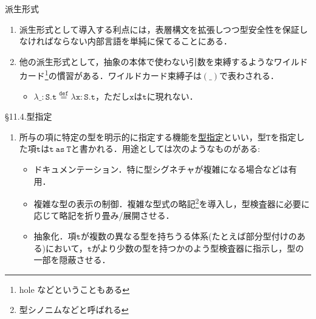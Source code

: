 \documentclass[9pt]{beamer}
\begin{document}
\begin{frame}{派生形式}
\begin{enumerate}\item 派生形式として導入する利点には，表層構文を拡張しつつ型安全性を保証しなければならない内部言語を単純に保てることにある．
    \item 他の派生形式として，抽象の本体で使わない引数を束縛するようなワイルドカード\footnote{hole などということもある}の慣習がある．ワイルドカード束縛子は$(\_)$で表わされる．
    \begin{itemize}
    \item $\mathtt{\lambda \_: S. t\stackrel{def}{=}\lambda x: S. t}$，ただし$\mathtt{x}$は$\mathtt{t}$に現れない．
    \end{itemize}
\end{enumerate}
\end{frame}
\begin{frame}{\S11.4.型指定}
\begin{enumerate}
\item 所与の項に特定の型を明示的に指定する機能を\underline{型指定}といい，型$\mathtt{T}$を指定した項$\mathtt{t}$は$\mathtt{t\ as\ T}$と書かれる．用途としては次のようなものがある:
\begin{itemize}
\item ドキュメンテーション．特に型シグネチャが複雑になる場合などは有用．
\item 複雑な型の表示の制御．複雑な型式の略記\footnote{型シノニムなどと呼ばれる}を導入し，型検査器に必要に応じて略記を折り畳み/展開させる．
\item 抽象化．項$\mathtt{t}$が複数の異なる型を持ちうる体系(たとえば部分型付けのある)において，$\mathtt{t}$がより少数の型を持つかのよう型検査器に指示し，型の一部を隠蔽させる．
\end{itemize}
\end{enumerate}
\end{frame}
\end{document}
